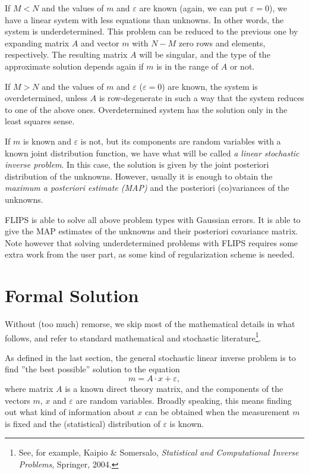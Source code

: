 \documentclass[a4paper,twoside]{refrep}
\newcommand{\ve}{\varepsilon}
\begin{document}
If $M<N$ and the values of $m$ and $\ve$ are known (again, we can put $\ve=0$), we have a linear system with less equations than unknowns. In other words, the system is underdetermined. This problem can be reduced to the previous one by expanding matrix $A$ and vector $m$ with $N-M$ zero rows and elements, respectively. The resulting matrix $A$ will be singular, and the type of the approximate solution depends again if $m$ is in the range of $A$ or not.

If $M>N$ and the values of $m$ and $\ve$ ($\ve=0$) are known, the system is overdetermined, unless $A$ is row-degenerate in such a way that the system reduces to one of the above ones. Overdetermined system has the solution only in the least squares sense.

If $m$ is known and $\ve$ is not, but its components are random variables with a known joint distribution function, we have what will be called \emph{a linear stochastic inverse problem}. In this case, the solution is given by the joint posteriori distribution of the unknowns. However, usually it is enough to obtain the \emph{maximum a posteriori estimate (MAP)} and the posteriori (co)variances of the unknowns. 

FLIPS is able to solve all above problem types with Gaussian errors. It is able to give the MAP estimates of the unknowns and their posteriori covariance matrix. Note however that solving underdetermined problems with FLIPS requires some extra work from the user part, as some kind of regularization scheme is needed.



\section{Formal Solution}\label{glipfs}

Without (too much) remorse, we skip most of the mathematical details in what follows, and refer to standard  mathematical and stochastic literature\footnote{See, for example, Kaipio \& Somersalo, \emph{Statistical and Computational Inverse Problems}, Springer, 2004.}.

As defined in the last section, the general stochastic linear inverse problem is to find ''the best possible'' solution to the equation
\[
m=A\cdot x + \ve,
\]
where matrix $A$ is a known direct theory matrix, and the components of the vectors $m$, $x$ and $\ve$ are random variables. Broadly speaking, this means finding out what kind of information about $x$ can be obtained when the measurement $m$ is fixed and the (statistical) distribution of $\ve$ is known.
\end{document}
